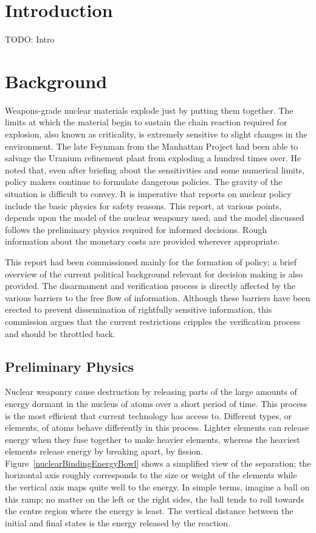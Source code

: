 \documentclass[twoside,titlepage,11pt,twocolumn,a4paper]{article}
\begin{document}
\newpage
\tableofcontents
\twocolumn

\section{Introduction}
TODO: Intro
\section{Background}
Weapons-grade nuclear materials explode just by putting them
together. The limits at which the material begin to sustain the chain
reaction required for explosion, also known as criticality, is
extremely sensitive to slight changes in the environment. The late
Feynman from the Manhattan Project had been able to salvage the
Uranium refinement plant from exploding a hundred times over. He noted
that, even after briefing about the sensitivities and some numerical
limits, policy makers continue to formulate dangerous
policies. \citep{FeynmanJoking} The gravity of the situation is
difficult to convey. It is imperative that reports on nuclear policy
include the basic physics for safety reasons. This report, at various
points, depends upon the model of the nuclear weaponry used, and the
model discussed follows the preliminary physics required for informed
decisions. Rough information about the monetary costs are provided
wherever appropriate.

This report had been commissioned mainly for the formation of policy;
a brief overview of the current political background relevant for
decision making is also provided. The disarmament and verification
process is directly affected by the various barriers to the free flow
of information. Although these barriers have been erected to prevent
dissemination of rightfully sensitive information, this commission
argues that the current restrictions cripples the verification
process and should be throttled back. 

\subsection{Preliminary Physics}
Nuclear weaponry cause destruction by releasing parts of the large
amounts of energy dormant in the nucleus of atoms over a short period
of time. This process is the most efficient that current technology
has access to. Different types, or elements, of atoms behave
differently in this process. Lighter elements can release energy when
they fuse together to make heavier elements, whereas the heaviest
elements release energy by breaking apart, by
fission. Figure~\ref{nuclearBindingEnergyBowl} shows a simplified view
of the separation; the horizontal axis roughly corresponds to the size
or weight of the elements while the vertical axis maps quite well to
the energy. In simple terms, imagine a ball on this ramp; no matter on
the left or the right sides, the ball tends to roll towards the centre
region where the energy is least. The vertical distance between the
initial and final states is the energy released by the reaction.
\end{document}
